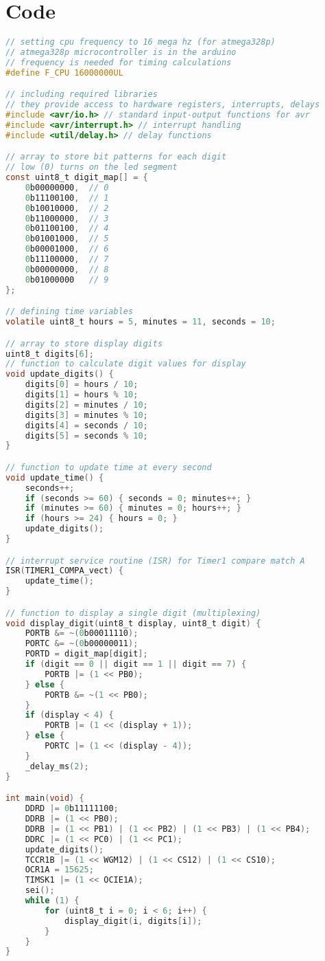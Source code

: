 \documentclass{article}
\begin{document}
\section{Code}
\begin{lstlisting}[language=C, basicstyle=\ttfamily, keywordstyle=\color{blue}, commentstyle=\color{green}]
// setting cpu frequency to 16 mega hz (for atmega328p)
// atmega328p microcontroller is in the arduino
// frequency is needed for timing calculations
#define F_CPU 16000000UL

// including required libraries
// they provide access to hardware registers, interrupts, delays
#include <avr/io.h> // standard input-output functions for avr
#include <avr/interrupt.h> // interrupt handling
#include <util/delay.h> // delay functions

// array to store bit patterns for each digit
// low (0) turns on the led segment
const uint8_t digit_map[] = {
    0b00000000,  // 0
    0b11100100,  // 1
    0b10010000,  // 2
    0b11000000,  // 3
    0b01100100,  // 4
    0b01001000,  // 5
    0b00001000,  // 6
    0b11100000,  // 7
    0b00000000,  // 8
    0b01000000   // 9
};

// defining time variables
volatile uint8_t hours = 5, minutes = 11, seconds = 10;

// array to store display digits
uint8_t digits[6];
// function to calculate digit values for display
void update_digits() {
    digits[0] = hours / 10;
    digits[1] = hours % 10;
    digits[2] = minutes / 10;
    digits[3] = minutes % 10;
    digits[4] = seconds / 10;
    digits[5] = seconds % 10;
}

// function to update time at every second
void update_time() {
    seconds++;
    if (seconds >= 60) { seconds = 0; minutes++; }
    if (minutes >= 60) { minutes = 0; hours++; }
    if (hours >= 24) { hours = 0; }
    update_digits();
}

// interrupt service routine (ISR) for Timer1 compare match A
ISR(TIMER1_COMPA_vect) {
    update_time();
}

// function to display a single digit (multiplexing)
void display_digit(uint8_t display, uint8_t digit) {
    PORTB &= ~(0b00011110);
    PORTC &= ~(0b00000011);
    PORTD = digit_map[digit];
    if (digit == 0 || digit == 1 || digit == 7) {
        PORTB |= (1 << PB0);
    } else {
        PORTB &= ~(1 << PB0);
    }
    if (display < 4) {
        PORTB |= (1 << (display + 1));
    } else {
        PORTC |= (1 << (display - 4));
    }
    _delay_ms(2);
}

int main(void) {
    DDRD |= 0b11111100;
    DDRB |= (1 << PB0);
    DDRB |= (1 << PB1) | (1 << PB2) | (1 << PB3) | (1 << PB4);
    DDRC |= (1 << PC0) | (1 << PC1);
    update_digits();
    TCCR1B |= (1 << WGM12) | (1 << CS12) | (1 << CS10);
    OCR1A = 15625;
    TIMSK1 |= (1 << OCIE1A);
    sei();
    while (1) {
        for (uint8_t i = 0; i < 6; i++) {
            display_digit(i, digits[i]);
        }
    }
}
\end{lstlisting}
\end{document}
